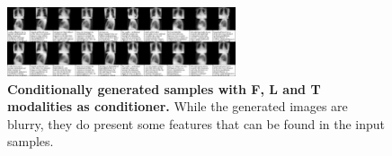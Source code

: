     \begin{frame}
        \begin{figure}
    \centering
    \includegraphics[width=0.6\textwidth, height = \textheight, keepaspectratio]{data/cond_gen/Lateral_PA_text}
    \caption{\tiny{
        \textbf{Conditionally generated samples with F, L and T modalities as conditioner.} While the generated images are blurry, they do present some features that can be found in the input samples.
    }}
    \label{fig:fig_cond_latPAtext}
\end{figure}
    \end{frame}

    \printbibliography

